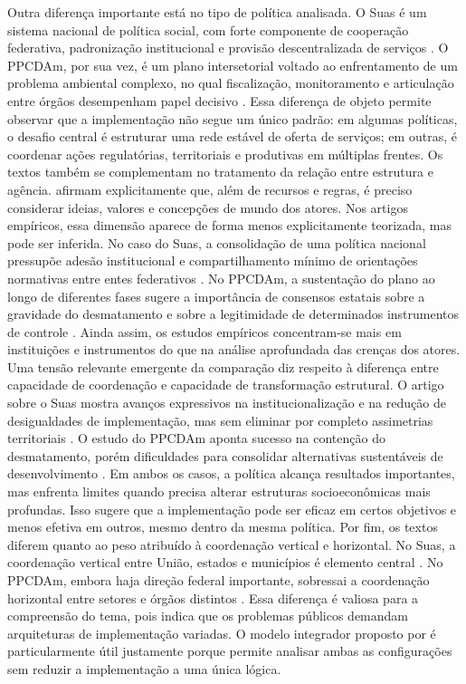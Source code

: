 \documentclass[12pt,a4paper]{article}
\begin{document}
Outra diferença importante está no tipo de política analisada. O Suas é um sistema nacional de política social, com forte componente de cooperação federativa, padronização institucional e provisão descentralizada de serviços \autocite{bichir2020_sistemas_nacionais}. O PPCDAm, por sua vez, é um plano intersetorial voltado ao enfrentamento de um problema ambiental complexo, no qual fiscalização, monitoramento e articulação entre órgãos desempenham papel decisivo \autocite{mello2017_evolucao_do}. Essa diferença de objeto permite observar que a implementação não segue um único padrão: em algumas políticas, o desafio central é estruturar uma rede estável de oferta de serviços; em outras, é coordenar ações regulatórias, territoriais e produtivas em múltiplas frentes.
Os textos também se complementam no tratamento da relação entre estrutura e agência. \textcite{dascenzi2013_implementacao_de} afirmam explicitamente que, além de recursos e regras, é preciso considerar ideias, valores e concepções de mundo dos atores. Nos artigos empíricos, essa dimensão aparece de forma menos explicitamente teorizada, mas pode ser inferida. No caso do Suas, a consolidação de uma política nacional pressupõe adesão institucional e compartilhamento mínimo de orientações normativas entre entes federativos \autocite{bichir2020_sistemas_nacionais}. No PPCDAm, a sustentação do plano ao longo de diferentes fases sugere a importância de consensos estatais sobre a gravidade do desmatamento e sobre a legitimidade de determinados instrumentos de controle \autocite{mello2017_evolucao_do}. Ainda assim, os estudos empíricos concentram-se mais em instituições e instrumentos do que na análise aprofundada das crenças dos atores.
Uma tensão relevante emergente da comparação diz respeito à diferença entre capacidade de coordenação e capacidade de transformação estrutural. O artigo sobre o Suas mostra avanços expressivos na institucionalização e na redução de desigualdades de implementação, mas sem eliminar por completo assimetrias territoriais \autocite{bichir2020_sistemas_nacionais}. O estudo do PPCDAm aponta sucesso na contenção do desmatamento, porém dificuldades para consolidar alternativas sustentáveis de desenvolvimento \autocite{mello2017_evolucao_do}. Em ambos os casos, a política alcança resultados importantes, mas enfrenta limites quando precisa alterar estruturas socioeconômicas mais profundas. Isso sugere que a implementação pode ser eficaz em certos objetivos e menos efetiva em outros, mesmo dentro da mesma política.
Por fim, os textos diferem quanto ao peso atribuído à coordenação vertical e horizontal. No Suas, a coordenação vertical entre União, estados e municípios é elemento central \autocite{bichir2020_sistemas_nacionais}. No PPCDAm, embora haja direção federal importante, sobressai a coordenação horizontal entre setores e órgãos distintos \autocite{mello2017_evolucao_do}. Essa diferença é valiosa para a compreensão do tema, pois indica que os problemas públicos demandam arquiteturas de implementação variadas. O modelo integrador proposto por \textcite{dascenzi2013_implementacao_de} é particularmente útil justamente porque permite analisar ambas as configurações sem reduzir a implementação a uma única lógica.
\end{document}

